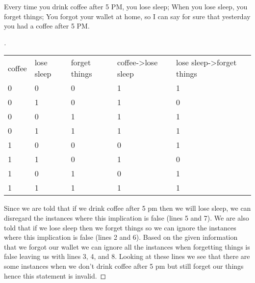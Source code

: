 \documentclass[12pt]{article}
\newenvironment{exercise}[2][Exercise]{\begin{trivlist}
\item[\hskip \labelsep {\bfseries #1}\hskip \labelsep {\bfseries #2.}]}{\end{trivlist}}
\newenvironment{solution}[1][{\color{red} Solution:}]{\begin{trivlist}
\item[\hskip \labelsep {\bfseries #1}\hskip \labelsep {\bfseries}]}{\end{trivlist}}
\begin{document}
\begin{exercise}{1}
\begin{enumerate}[(a)]
\begin{solution}
    
    \end{solution}


    \item Every time you drink coffee after 5 PM, you lose sleep; When you lose sleep, you forget things; You forgot your wallet at home, so I can say for sure that yesterday you had a coffee after 5 PM.
    
    \begin{solution} 
        \begin{proof}[\unskip\nopunct]
        \begin{table}[h]
\begin{tabular}{lllll}
coffee & lose sleep & forget things & coffee-\textgreater{}lose sleep & lose sleep-\textgreater{}forget things \\
0      & 0          & 0             & 1                               & 1                                      \\
0      & 1          & 0             & 1                               & 0                                      \\
0      & 0          & 1             & 1                               & 1                                      \\
0      & 1          & 1             & 1                               & 1                                      \\
1      & 0          & 0             & 0                               & 1                                      \\
1      & 1          & 0             & 1                               & 0                                      \\
1      & 0          & 1             & 0                               & 1                                      \\
1      & 1          & 1             & 1                               & 1                                     
\end{tabular}
\end{table}
            Since we are told that if we drink coffee after 5 pm then we will lose sleep, we can disregard the instances where this implication is false (lines 5 and 7). We are also told that if we lose sleep then we forget things so we can ignore the instances where this implication is false (lines 2 and 6). Based on the given information that we forgot our wallet we can ignore all the instances when forgetting things is false leaving us with lines 3, 4, and 8. Looking at these lines we see that there are some instances when we don't drink coffee after 5 pm but still forget our things hence this statement is invalid. 
        \end{proof}
    \end{solution}
    
\end{enumerate}
\end{exercise}
\end{document}
